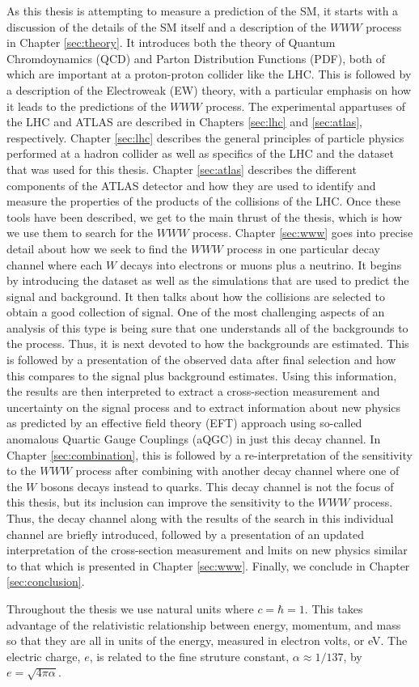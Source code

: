 As this thesis is attempting to measure a prediction of the SM, it starts
with a discussion of the details of the SM itself and a description of the 
$WWW$ process in Chapter \ref{sec:theory}. It introduces both the theory 
of Quantum Chromdoynamics (QCD) and Parton Distribution Functions (PDF), both
of which are important at a proton-proton collider like the LHC.  This is followed by 
a description of the Electroweak (EW) theory, with a particular emphasis
on how it leads to the predictions of the $WWW$ process. The experimental
appartuses of the LHC and ATLAS are described in Chapters \ref{sec:lhc} and
\ref{sec:atlas}, respectively. Chapter \ref{sec:lhc}
describes the general principles of particle physics performed at a hadron collider
as well as specifics of the LHC and the dataset that was used for this thesis. 
Chapter \ref{sec:atlas} describes the different components of the ATLAS detector
and how they are used to identify and measure the properties of the products
of the collisions of the LHC.  Once these tools have been described, 
we get to the main thrust of the thesis, which is how we use them to search for the 
$WWW$ process.  Chapter \ref{sec:www} goes into precise detail about how
we seek to find the $WWW$ process in one particular decay channel where 
each $W$ decays into electrons or muons plus a neutrino. It begins by introducing the 
dataset as well as  the simulations that are used to predict the signal and background.
It then talks about how the collisions are selected to obtain a good collection of signal.
One of the most challenging aspects of an analysis of this type is being sure
that one understands all of the backgrounds to the process. Thus, it is next devoted
to how the backgrounds are estimated. This is followed by a presentation of the observed
data after final selection and how this compares to the signal plus background estimates. 
Using this information, the results are then interpreted to extract a cross-section
measurement and uncertainty on the signal process and to extract information about
new physics as predicted by an effective field theory (EFT) approach using so-called 
anomalous Quartic Gauge Couplings (aQGC) in just this decay channel. In Chapter
\ref{sec:combination}, this is 
followed by a re-interpretation of the sensitivity to the $WWW$ process
after combining with another decay channel where one of the $W$ bosons  decays instead
to quarks. This decay channel is not the focus of this thesis, but its inclusion can
improve the sensitivity to the $WWW$ process. Thus, the decay channel along with
the results of the search in this individual channel are briefly introduced, followed
by a presentation of an updated interpretation of the cross-section measurement and 
lmits on new physics similar to that which is presented in Chapter \ref{sec:www}.
Finally, we conclude in Chapter \ref{sec:conclusion}.

Throughout the thesis we use natural units where $c = \hbar = 1$. This takes advantage
of the relativistic relationship between energy, momentum, and mass so that they 
are all in units of the energy, measured in electron volts, or eV. The electric charge, $e$, is related
to the fine struture constant, $\alpha \approx 1/137$, by $e = \sqrt{4 \pi \alpha}$.



